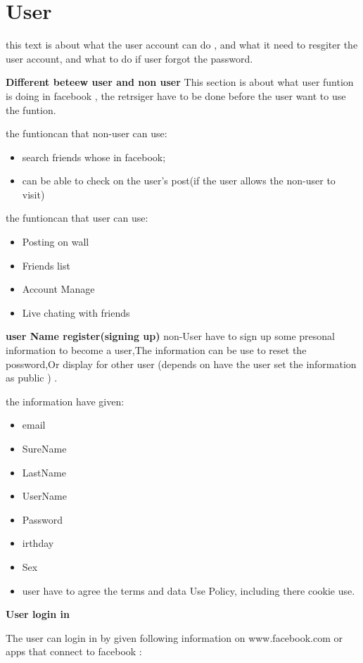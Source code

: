 \section{User}

this text is about what the user account can do , and what it need to resgiter the user account, and what to do if user forgot the password.

\textbf{Different beteew user and non user}
This section is about what user funtion is doing in facebook , the retrsiger have to be done before the user want to use the funtion.

the funtioncan that non-user can use:
\begin{itemize}
\item search friends whose in facebook;
\item can be able to check on the user's post(if the user allows the non-user to visit)
\end{itemize}

the funtioncan that user can use:
\begin{itemize}
\item Posting on wall
\item Friends list 
\item Account Manage
\item Live chating with friends
\end{itemize}

\textbf{user Name register(signing up)}
non-User have to sign up some presonal information to become a user,The information can be use to reset the possword,Or display for other user (depends on have the user set the information as public ) .

the information have given:
\begin{itemize}
\item email
\item SureName
\item LastName
\item UserName
\item Password
\item irthday
\item Sex
\item user have to agree the terms and data Use Policy, including there cookie use.
\end{itemize}

\textbf{User login in}

The user can login in by given following information on www.facebook.com or apps that connect to facebook : 

